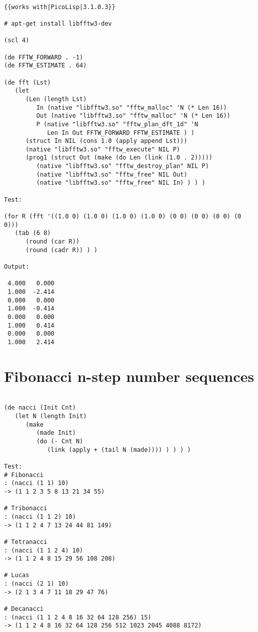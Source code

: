\begin{verbatim}

{{works with|PicoLisp|3.1.0.3}}

# apt-get install libfftw3-dev

(scl 4)

(de FFTW_FORWARD . -1)
(de FFTW_ESTIMATE . 64)

(de fft (Lst)
   (let
      (Len (length Lst)
         In (native "libfftw3.so" "fftw_malloc" 'N (* Len 16))
         Out (native "libfftw3.so" "fftw_malloc" 'N (* Len 16))
         P (native "libfftw3.so" "fftw_plan_dft_1d" 'N
            Len In Out FFTW_FORWARD FFTW_ESTIMATE ) )
      (struct In NIL (cons 1.0 (apply append Lst)))
      (native "libfftw3.so" "fftw_execute" NIL P)
      (prog1 (struct Out (make (do Len (link (1.0 . 2)))))
         (native "libfftw3.so" "fftw_destroy_plan" NIL P)
         (native "libfftw3.so" "fftw_free" NIL Out)
         (native "libfftw3.so" "fftw_free" NIL In) ) ) )

Test:

(for R (fft '((1.0 0) (1.0 0) (1.0 0) (1.0 0) (0 0) (0 0) (0 0) (0 0)))
   (tab (6 8)
      (round (car R))
      (round (cadr R)) ) )

Output:

 4.000   0.000
 1.000  -2.414
 0.000   0.000
 1.000  -0.414
 0.000   0.000
 1.000   0.414
 0.000   0.000
 1.000   2.414

\end{verbatim}

\section*{Fibonacci n-step number sequences}

\begin{verbatim}

(de nacci (Init Cnt)
   (let N (length Init)
      (make
         (made Init)
         (do (- Cnt N)
            (link (apply + (tail N (made)))) ) ) ) )

Test:
# Fibonacci
: (nacci (1 1) 10)
-> (1 1 2 3 5 8 13 21 34 55)

# Tribonacci
: (nacci (1 1 2) 10)
-> (1 1 2 4 7 13 24 44 81 149)

# Tetranacci
: (nacci (1 1 2 4) 10)
-> (1 1 2 4 8 15 29 56 108 208)

# Lucas
: (nacci (2 1) 10)
-> (2 1 3 4 7 11 18 29 47 76)

# Decanacci
: (nacci (1 1 2 4 8 16 32 64 128 256) 15)
-> (1 1 2 4 8 16 32 64 128 256 512 1023 2045 4088 8172)

\end{verbatim}

